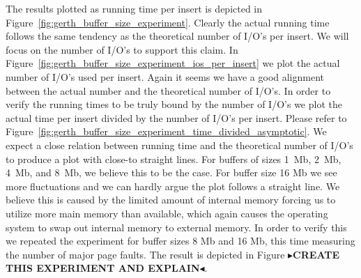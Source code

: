\documentclass[twoside,11pt,openright]{report}
\newcommand{\todo}[1]{{\color[rgb]{.5,0,0}\textbf{$\blacktriangleright$#1$\blacktriangleleft$}}}
\begin{document}
The results plotted as running time per insert is depicted in Figure~\ref{fig:gerth_buffer_size_experiment}. Clearly the actual running time follows the same tendency as the theoretical number of I/O's per insert. We will focus on the number of I/O's to support this claim. In Figure~\ref{fig:gerth_buffer_size_experiment_ios_per_insert} we plot the actual number of I/O's used per insert. Again it seems we have a good alignment between the actual number and the theoretical number of I/O's. In order to verify the running times to be truly bound by the number of I/O's we plot the actual time per insert divided by the number of I/O's per insert. Please refer to Figure~\ref{fig:gerth_buffer_size_experiment_time_divided_asymptotic}. We expect a close relation between running time and the theoretical number of I/O's to produce a plot with close-to straight lines. For buffers of sizes 1~Mb, 2~Mb, 4~Mb, and 8~Mb, we believe this to be the case. For buffer size 16 Mb we see more fluctuations and we can hardly argue the plot follows a straight line. We believe this is caused by the limited amount of internal memory forcing us to utilize more main memory than available, which again causes the operating system to swap out internal memory to external memory. In order to verify this we repeated the experiment for buffer sizes 8 Mb and 16 Mb, this time measuring the number of major page faults. The result is depicted in Figure \todo{CREATE THIS EXPERIMENT AND EXPLAIN}.
\end{document}
